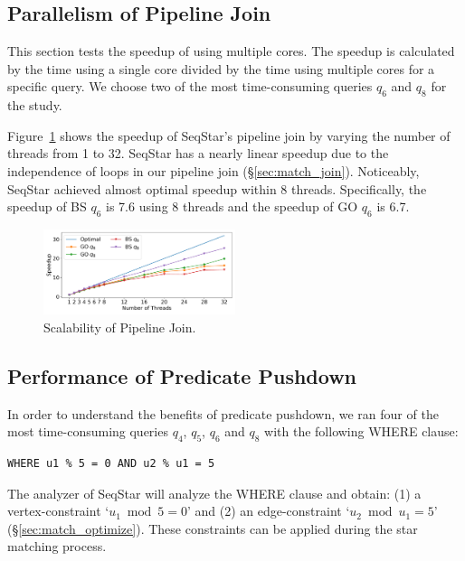 \subsection{Parallelism of Pipeline Join}\label{sec:experiments_join}
This section tests the speedup of using multiple cores. The speedup is calculated by the time using a single core divided by the time using multiple cores for a specific query.
We choose two of the most time-consuming queries $q_6$ and $q_8$ for the study.

Figure~\ref{img:exp_scalability} shows the speedup of SeqStar's pipeline join by varying the number of threads from 1 to 32.
SeqStar has a nearly linear speedup due to the independence of loops in our pipeline join (\S\ref{sec:match_join}).
Noticeably, SeqStar achieved almost optimal speedup within 8 threads.
Specifically, the speedup of BS $q_6$ is 7.6 using 8 threads and the speedup of GO $q_6$ is 6.7.
\begin{figure}[ht]
  \centering
  \includegraphics[width=0.5\textwidth]{img/exp_scalability.pdf}
  \caption{Scalability of Pipeline Join.}\label{img:exp_scalability}
\end{figure}

\subsection{Performance of Predicate Pushdown}
In order to understand the benefits of predicate pushdown,
we ran four of the most time-consuming queries $q_4$, $q_5$, $q_6$ and $q_8$ with the following WHERE clause:
\begin{Verbatim}[fontsize=\small]
  WHERE u1 % 5 = 0 AND u2 % u1 = 5
\end{Verbatim}
The analyzer of SeqStar will analyze the WHERE clause and obtain:
(1) a vertex-constraint `$u_1 \bmod 5 = 0$' and (2) an edge-constraint `$u_2 \bmod u_1 = 5$' (\S\ref{sec:match_optimize}).
These constraints can be applied during the star matching process.

